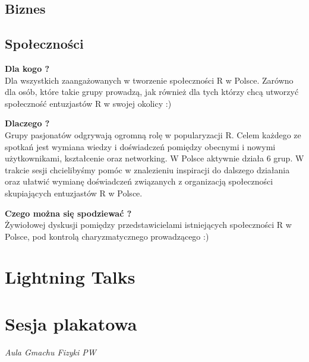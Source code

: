 \documentclass[11pt,twoside,b5paper]{book}
\begin{document}
\section{Biznes}

\newpage



\newpage
\section{Społeczności}
\textbf{Dla kogo ?} \\
Dla wszystkich zaangażowanych w tworzenie społeczności R w Polsce. Zarówno dla osób, które takie grupy prowadzą, jak również dla tych którzy chcą utworzyć społeczność entuzjastów R w swojej okolicy :)

\textbf{Dlaczego ?}\\
Grupy pasjonatów odgrywają ogromną rolę w popularyzacji R. Celem każdego ze spotkań jest wymiana wiedzy i doświadczeń pomiędzy obecnymi i nowymi użytkownikami, kształcenie oraz networking. W Polsce aktywnie działa 6 grup. W trakcie sesji chcielibyśmy pomóc w znalezieniu inspiracji do dalszego działania oraz ułatwić wymianę doświadczeń związanych z organizacją społeczności skupiających entuzjastów R w Polsce.

\textbf{Czego można się spodziewać ?}\\
Żywiołowej dyskusji pomiędzy przedstawicielami istniejących społeczności R w Polsce, pod kontrolą charyzmatycznego prowadzącego :)
\newpage
\newpage
\chapter{Lightning Talks}






\newpage
\chapter{Sesja plakatowa}{\LARGE \textit{Aula Gmachu Fizyki PW}}




\newpage
\end{document}
